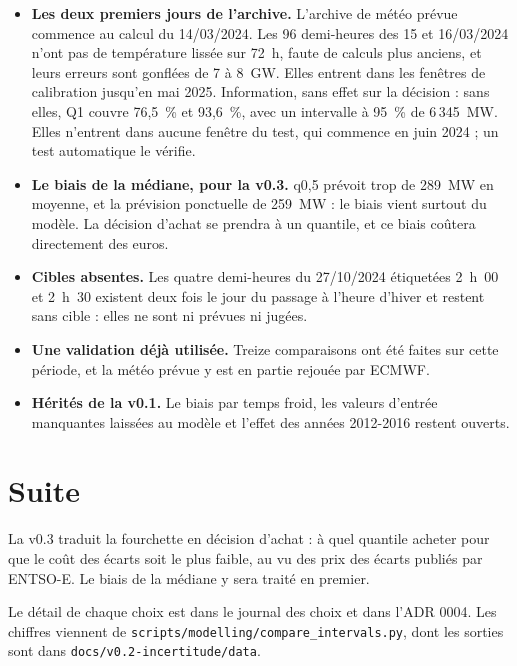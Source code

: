 \documentclass[11pt,a4paper]{article}
\begin{document}
\begin{itemize}
  \item \textbf{Les deux premiers jours de l'archive.} L'archive de météo prévue commence au calcul du 14/03/2024. Les 96 demi-heures des 15 et 16/03/2024 n'ont pas de température lissée sur 72~h, faute de calculs plus anciens, et leurs erreurs sont gonflées de 7 à 8~GW. Elles entrent dans les fenêtres de calibration jusqu'en mai 2025. Information, sans effet sur la décision : sans elles, Q1 couvre 76,5~\% et 93,6~\%, avec un intervalle à 95~\% de 6\,345~MW. Elles n'entrent dans aucune fenêtre du test, qui commence en juin 2024 ; un test automatique le vérifie.
  \item \textbf{Le biais de la médiane, pour la v0.3.} q0,5 prévoit trop de 289~MW en moyenne, et la prévision ponctuelle de 259~MW : le biais vient surtout du modèle. La décision d'achat se prendra à un quantile, et ce biais coûtera directement des euros.
  \item \textbf{Cibles absentes.} Les quatre demi-heures du 27/10/2024 étiquetées 2~h~00 et 2~h~30 existent deux fois le jour du passage à l'heure d'hiver et restent sans cible : elles ne sont ni prévues ni jugées.
  \item \textbf{Une validation déjà utilisée.} Treize comparaisons ont été faites sur cette période, et la météo prévue y est en partie rejouée par ECMWF.
  \item \textbf{Hérités de la v0.1.} Le biais par temps froid, les valeurs d'entrée manquantes laissées au modèle et l'effet des années 2012-2016 restent ouverts.
\end{itemize}

\section{Suite}

La v0.3 traduit la fourchette en décision d'achat : à quel quantile acheter pour que le coût des écarts soit le plus faible, au vu des prix des écarts publiés par ENTSO-E. Le biais de la médiane y sera traité en premier.

Le détail de chaque choix est dans le journal des choix et dans l'ADR 0004. Les chiffres viennent de \nolinkurl{scripts/modelling/compare_intervals.py}, dont les sorties sont dans \nolinkurl{docs/v0.2-incertitude/data}.
\end{document}
